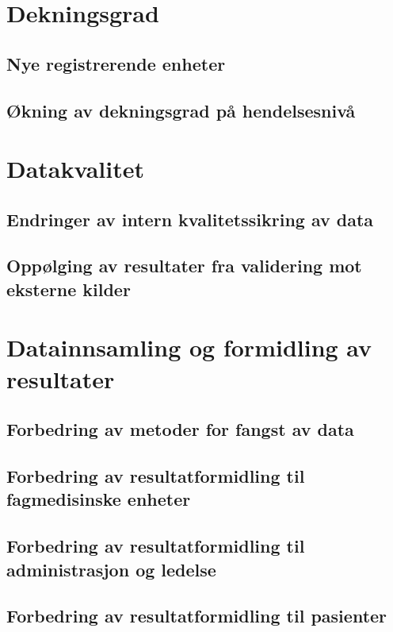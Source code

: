 \documentclass[norsk, a4paper, twocolumn]{report}
\begin{document}
\chapter{Dekningsgrad}
\fyll

\section{Nye registrerende enheter}
\fyll

\section{Økning av dekningsgrad på hendelsesnivå}
\fyll

\chapter{Datakvalitet}
\fyll

\section{Endringer av intern kvalitetssikring av data}
\fyll

\section{Oppølging av resultater fra validering mot eksterne kilder}
\fyll

\chapter{Datainnsamling og formidling av resultater}
\fyll

\section{Forbedring av metoder for fangst av data}
\fyll

\section{Forbedring av resultatformidling til fagmedisinske enheter}
\fyll

\section{Forbedring av resultatformidling til administrasjon og ledelse}
\fyll

\section{Forbedring av resultatformidling til pasienter}
\fyll
\end{document}
